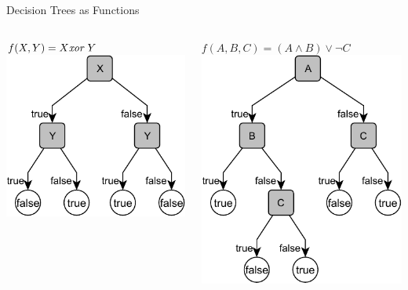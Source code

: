 \documentclass[12pt]{beamer}
\newcommand{\EM}[1]{\mbox{\em#1}}
\begin{document}
\begin{frame}{Decision Trees as Functions}
	\begin{columns}[t]
		\begin{column}{2in}
			$f(X, Y) = X \EM{ xor } Y$ \\[1em]
			\includegraphics[scale=.75]{xor}
		\end{column}
		\begin{column}{2in}
			$f(A, B, C) = (A \land B) \lor \lnot C$ \\[1em]
			\includegraphics[scale=.75]{abc}
		\end{column}
	\end{columns}
\end{frame}
\end{document}
